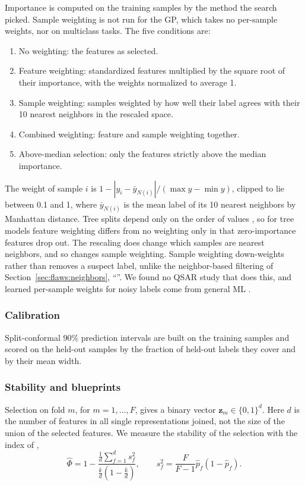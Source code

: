 Importance is computed on the training samples by the method the search picked. Sample weighting is not run for the GP, which takes no per-sample weights, nor on multiclass tasks. The five conditions are:
\begin{enumerate}[leftmargin=*]
    \item No weighting: the features as selected.
    \item Feature weighting: standardized features multiplied by the square root of their importance, with the weights normalized to average 1.
    \item Sample weighting: samples weighted by how well their label agrees with their 10 nearest neighbors in the rescaled space.
    \item Combined weighting: feature and sample weighting together.
    \item Above-median selection: only the features strictly above the median importance.
\end{enumerate}
The weight of sample $i$ is $1 - |y_i - \bar y_{N(i)}| / (\max y - \min y)$, clipped to lie between 0.1 and 1, where $\bar y_{N(i)}$ is the mean label of its 10 nearest neighbors by Manhattan distance. Tree splits depend only on the order of values \citep{Hastie2009}, so for tree models feature weighting differs from no weighting only in that zero-importance features drop out. The rescaling does change which samples are nearest neighbors, and so changes sample weighting. Sample weighting down-weights rather than removes a suspect label, unlike the neighbor-based filtering of Section~\ref{sec:flaws:neighbors}, ``''. We found no QSAR study that does this, and learned per-sample weights for noisy labels come from general ML \citep{shu2019metaweightnet}.


\subsubsection{Calibration}

Split-conformal 90\% prediction intervals are built on the training samples and scored on the held-out samples by the fraction of held-out labels they cover and by their mean width.

\subsubsection{Stability and blueprints}

Selection on fold $m$, for $m = 1, \dots, F$, gives a binary vector $\mathbf{z}_m \in \{0,1\}^d$. Here $d$ is the number of features in all single representations joined, not the size of the union of the selected features. We measure the stability of the selection with the index of \citet{Nogueira2018},
\[
\hat\Phi = 1 - \frac{\frac1d\sum_{f=1}^d s_f^2}{\frac{\bar k}{d}\left(1-\frac{\bar k}{d}\right)}, \qquad s_f^2 = \frac{F}{F-1}\hat p_f(1-\hat p_f).
\]

